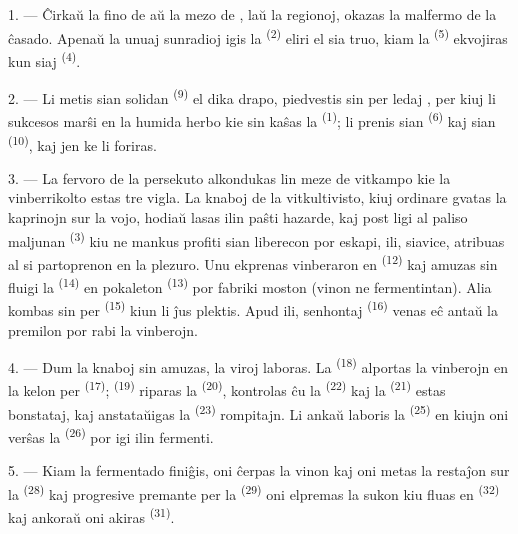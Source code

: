 \VUsaut{1.4mm}
\VUsaut{4.0mm}

1. --- Ĉirkaŭ la fino de  aŭ la mezo de , laŭ
la regionoj, okazas la malfermo de la ĉasado. Apenaŭ la unuaj sunradioj igis la
 \textsuperscript{(2)} eliri el sia truo, kiam la
 \textsuperscript{(5)} ekvojiras kun siaj 
\textsuperscript{(4)}.

2. --- Li metis sian solidan  \textsuperscript{(9)} el dika
drapo, piedvestis sin per ledaj , per kiuj li sukcesos marŝi en
la humida herbo kie sin kaŝas la  \textsuperscript{(1)}; li prenis
sian  \textsuperscript{(6)} kaj sian 
\textsuperscript{(10)}, kaj jen ke li foriras.

3. --- La fervoro de la persekuto alkondukas lin meze de vitkampo kie la
vinberrikolto estas tre vigla. La knaboj de la vitkultivisto, kiuj ordinare
gvatas la kaprinojn sur la vojo, hodiaŭ lasas ilin paŝti hazarde, kaj post
ligi al paliso maljunan  \textsuperscript{(3)} kiu ne
mankus profiti sian liberecon por eskapi, ili, siavice, atribuas al si
partoprenon en la plezuro. Unu ekprenas vinberaron en 
\textsuperscript{(12)} kaj amuzas sin fluigi la 
\textsuperscript{(14)} en pokaleton \textsuperscript{(13)} por fabriki moston
(vinon ne fermentintan). Alia kombas sin per 
\textsuperscript{(15)} kiun li ĵus plektis. Apud ili, senhontaj
 \textsuperscript{(16)} venas eĉ antaŭ la premilon por rabi la
vinberojn.

4. --- Dum la knaboj sin amuzas, la viroj laboras. La
 \textsuperscript{(18)} alportas la vinberojn en la
kelon per  \textsuperscript{(17)}; 
\textsuperscript{(19)} riparas la  \textsuperscript{(20)},
kontrolas ĉu la  \textsuperscript{(22)} kaj la 
\textsuperscript{(21)} estas bonstataj, kaj anstataŭigas la 
\textsuperscript{(23)} rompitajn. Li ankaŭ laboris la 
\textsuperscript{(25)} en kiujn oni verŝas la 
\textsuperscript{(26)} por igi ilin fermenti.

5. --- Kiam la fermentado finiĝis, oni ĉerpas la vinon kaj oni metas la
restaĵon sur la  \textsuperscript{(28)} kaj progresive
premante per la  \textsuperscript{(29)} oni elpremas la sukon
kiu fluas en  \textsuperscript{(32)} kaj ankoraŭ oni akiras
 \textsuperscript{(31)}.

